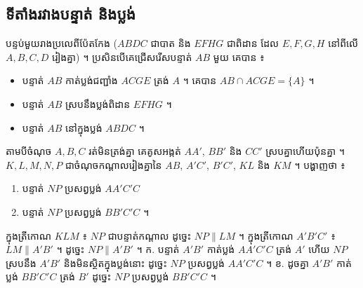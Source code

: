 \subsection{ទីតាំងរវាងបន្ទាត់ និងប្លង់}
\begin{center}
\end{center}

\begin{example}[ឧទាហរណ៍]
បន្ទប់មួយរាងប្រលេពីប៉ែតកែង ($ABDC$ ជាបាត និង $EFHG$ ជាពិដាន ដែល $E, F, G, H$ នៅពីលើ $A, B, C, D$ រៀងគ្នា) ។ ប្រសិនបើគេជ្រើសរើសបន្ទាត់ $AB$ មួយ គេបាន ៖
\end{example}
\begin{itemize}
  \item បន្ទាត់ $AB$ កាត់ប្លង់ជញ្ជាំង $ACGE$ ត្រង់ $A$ ។ គេបាន $AB \cap ACGE = \{A\}$ ។
  \item បន្ទាត់ $AB$ ស្របនឹងប្លង់ពិដាន $EFHG$ ។
  \item បន្ទាត់ $AB$ នៅក្នុងប្លង់ $ABDC$ ។
\end{itemize}

\begin{pro}
តាមបីចំណុច $A, B, C$ រត់មិនត្រង់គ្នា គេគូសអង្កត់ $AA'$, $BB'$ និង $CC'$ ស្របគ្នាហើយប៉ុនគ្នា ។ $K, L, M, N, P$ ជាចំណុចកណ្ដាលរៀងគ្នានៃ $AB$, $A'C'$, $B'C'$, $KL$ និង $KM$ ។ បង្ហាញថា ៖
\begin{enumerate}[a]
  \item បន្ទាត់ $NP$ ប្រសព្វប្លង់ $AA'C'C$
  \item បន្ទាត់ $NP$ ប្រសព្វប្លង់ $BB'C'C$ ។
\end{enumerate}
\ans
ក្នុងត្រីកោណ $KLM$ ៖ $NP$ ជាបន្ទាត់កណ្ដាល ដូច្នេះ $NP \parallel LM$ ។ ក្នុងត្រីកោណ $A'B'C'$ ៖ $LM \parallel A'B'$ ។ ដូច្នេះ $NP \parallel A'B'$ ។ ក. បន្ទាត់ $A'B'$ កាត់ប្លង់ $AA'C'C$ ត្រង់ $A'$ ហើយ $NP$ ស្របនឹង $A'B'$ និងមិនស្ថិតក្នុងប្លង់នោះ ដូច្នេះ $NP$ ប្រសព្វប្លង់ $AA'C'C$ ។ \quad ខ. ដូចគ្នា $A'B'$ កាត់ប្លង់ $BB'C'C$ ត្រង់ $B'$ ដូច្នេះ $NP$ ប្រសព្វប្លង់ $BB'C'C$ ។
\end{pro}

